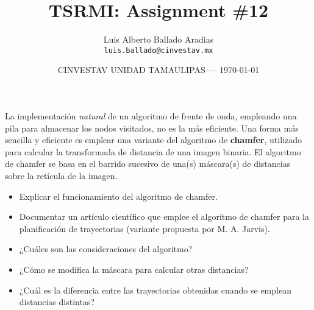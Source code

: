 \documentclass{article}
\title{TSRMI: Assignment \#12} %
\author{Luis Alberto Ballado Aradias\\ \texttt{luis.ballado@cinvestav.mx}} %
\date{CINVESTAV UNIDAD TAMAULIPAS --- \today} %
\begin{document}
\maketitle %


La implementación \textit{natural} de un algoritmo de frente de onda, empleando una pila para almacenar los nodos visitados, no es la más eficiente. Una forma más sencilla y eficiente es emplear una variante del algoritmo de \textbf{chamfer}, utilizado para calcular la transformada de distancia de una imagen binaria. El algoritmo de chamfer se basa en el barrido sucesivo de una(s) máscara(s) de distancias sobre la retícula de la imagen.\\

\begin{itemize}
\item Explicar el funcionamiento del algoritmo de chamfer.
\item Documentar un artículo científico que emplee el algoritmo de chamfer para la planificación de trayectorias (variante propuesta por M. A. Jarvis).
\item ¿Cuáles son las consideraciones del algoritmo?
\item ¿Cómo se modifica la máscara para calcular otras distancias?
\item ¿Cuál es la diferencia entre las trayectorias obtenidas cuando se emplean distancias distintas?
\end{itemize}
\end{document}
